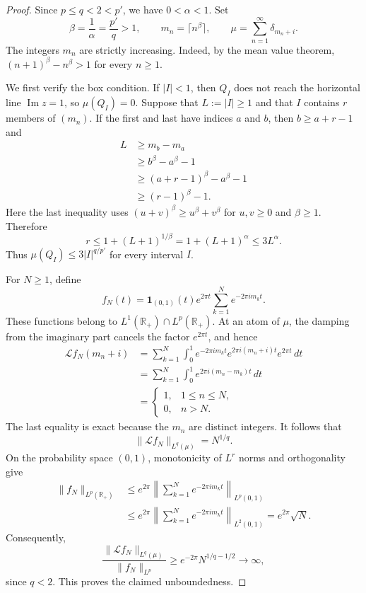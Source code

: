 \documentclass[11pt]{article}
\newcommand{\R}{\mathbb R}
\begin{document}
\begin{proof}
Since $p\le q<2<p'$, we have $0<\alpha<1$.  Set
\[
 \beta=\frac1\alpha=\frac{p'}q>1,
 \qquad m_n=\lceil n^\beta\rceil,
 \qquad \mu=\sum_{n=1}^\infty\delta_{m_n+i}.
\]
The integers $m_n$ are strictly increasing.  Indeed, by the mean value theorem,
$(n+1)^\beta-n^\beta>1$ for every $n\ge1$.

We first verify the box condition.  If $|I|<1$, then $Q_I$ does not reach the
horizontal line $\operatorname{Im}z=1$, so $\mu(Q_I)=0$.  Suppose that
$L:=|I|\ge1$ and that $I$ contains $r$ members of $(m_n)$.  If the first and
last have indices $a$ and $b$, then $b\ge a+r-1$ and
\begin{align*}
 L
 &\ge m_b-m_a\\
 &\ge b^\beta-a^\beta-1\\
 &\ge (a+r-1)^\beta-a^\beta-1\\
 &\ge (r-1)^\beta-1.
\end{align*}
Here the last inequality uses $(u+v)^\beta\ge u^\beta+v^\beta$ for
$u,v\ge0$ and $\beta\ge1$.  Therefore
\[
 r\le 1+(L+1)^{1/\beta}
 =1+(L+1)^\alpha
 \le 3L^\alpha.
\]
Thus $\mu(Q_I)\le3|I|^{q/p'}$ for every interval $I$.

For $N\ge1$, define
\[
 f_N(t)=\mathbf 1_{(0,1)}(t)e^{2\pi t}
        \sum_{k=1}^N e^{-2\pi i m_kt}.
\]
These functions belong to $L^1(\R_+)\cap L^p(\R_+)$.  At an atom of $\mu$,
the damping from the imaginary part cancels the factor $e^{2\pi t}$, and hence
\begin{align*}
 \mathcal Lf_N(m_n+i)
 &=\sum_{k=1}^N\int_0^1
   e^{-2\pi i m_kt}e^{2\pi i(m_n+i)t}e^{2\pi t}\,dt\\
 &=\sum_{k=1}^N\int_0^1 e^{2\pi i(m_n-m_k)t}\,dt\\
 &=\begin{cases}1,&1\le n\le N,\\0,&n>N.\end{cases}
\end{align*}
The last equality is exact because the $m_n$ are distinct integers.  It follows
that
\[
 \|\mathcal Lf_N\|_{L^q(\mu)}=N^{1/q}.
\]
On the probability space $(0,1)$, monotonicity of $L^r$ norms and orthogonality
give
\begin{align*}
 \|f_N\|_{L^p(\R_+)}
 &\le e^{2\pi}
 \left\|\sum_{k=1}^N e^{-2\pi i m_kt}\right\|_{L^p(0,1)}\\
 &\le e^{2\pi}
 \left\|\sum_{k=1}^N e^{-2\pi i m_kt}\right\|_{L^2(0,1)}
 =e^{2\pi}\sqrt N.
\end{align*}
Consequently,
\[
 \frac{\|\mathcal Lf_N\|_{L^q(\mu)}}{\|f_N\|_{L^p}}
 \ge e^{-2\pi}N^{1/q-1/2}\longrightarrow\infty,
\]
since $q<2$.  This proves the claimed unboundedness.
\end{proof}
\end{document}
